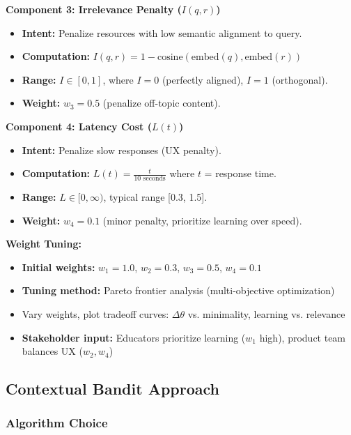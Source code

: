 \documentclass[11pt,letterpaper]{article}
\begin{document}
\textbf{Component 3: Irrelevance Penalty ($I(q, r)$)}
\begin{itemize}
\item \textbf{Intent:} Penalize resources with low semantic alignment to query.
\item \textbf{Computation:} $I(q, r) = 1 - \text{cosine}(\text{embed}(q), \text{embed}(r))$
\item \textbf{Range:} $I \in [0, 1]$, where $I=0$ (perfectly aligned), $I=1$ (orthogonal).
\item \textbf{Weight:} $w_3 = 0.5$ (penalize off-topic content).
\end{itemize}

\textbf{Component 4: Latency Cost ($L(t)$)}
\begin{itemize}
\item \textbf{Intent:} Penalize slow responses (UX penalty).
\item \textbf{Computation:} $L(t) = \frac{t}{10 \text{ seconds}}$ where $t$ = response time.
\item \textbf{Range:} $L \in [0, \infty)$, typical range [0.3, 1.5].
\item \textbf{Weight:} $w_4 = 0.1$ (minor penalty, prioritize learning over speed).
\end{itemize}

\textbf{Weight Tuning:}
\begin{itemize}
\item \textbf{Initial weights:} $w_1 = 1.0$, $w_2 = 0.3$, $w_3 = 0.5$, $w_4 = 0.1$
\item \textbf{Tuning method:} Pareto frontier analysis (multi-objective optimization)
\item Vary weights, plot tradeoff curves: $\Delta\theta$ vs. minimality, learning vs. relevance
\item \textbf{Stakeholder input:} Educators prioritize learning ($w_1$ high), product team balances UX ($w_2, w_4$)
\end{itemize}

\subsection{Contextual Bandit Approach}\label{subsec:contextual-bandit}

\subsubsection{Algorithm Choice}
\end{document}
